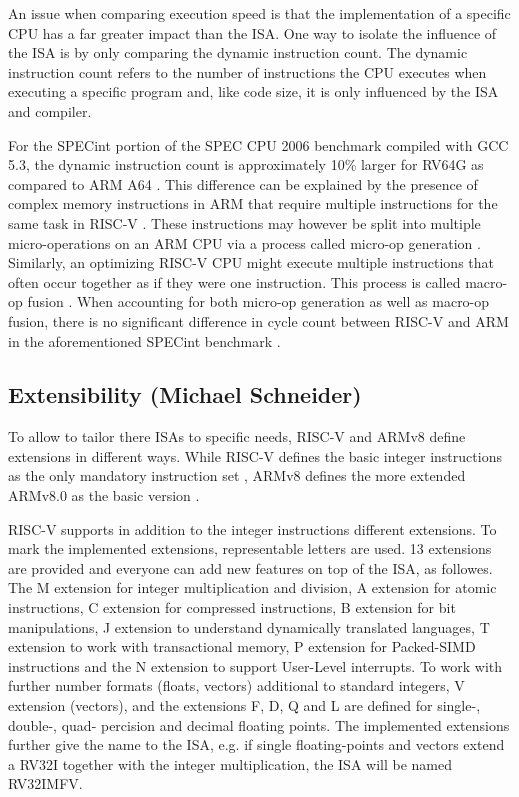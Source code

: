 \documentclass[conference]{IEEEtran}
\begin{document}
	An issue when comparing execution speed is that the implementation of a specific \gls{CPU} has a far greater impact than the \gls{ISA}.
	One way to isolate the influence of the ISA is by only comparing the dynamic instruction count.
	The dynamic instruction count refers to the number of instructions the \gls{CPU} executes when executing a specific program
	and, like code size, it is only influenced by the \gls{ISA} and compiler.

	For the SPECint portion of the SPEC CPU 2006 benchmark compiled with GCC 5.3, the dynamic instruction count is approximately
	10\% larger for RV64G as compared to ARM A64 \cite[slide 38]{Celio2016}.
	This difference can be explained by the presence of complex memory instructions in ARM that require multiple instructions
	for the same task in RISC-V \cite[slide 40]{Celio2016}.
	These instructions may however be split into multiple micro-operations on an ARM \gls{CPU} via a process called micro-op generation \cite[slide 40]{Celio2016}.
	Similarly, an optimizing RISC-V CPU might execute multiple instructions that often occur together as if they were one instruction.
	This process is called macro-op fusion \cite[slide 16]{Celio2016}.
	When accounting for both micro-op generation as well as macro-op fusion, there is no significant difference in cycle count between RISC-V and ARM
	in the aforementioned SPECint benchmark \cite[slide 38]{Celio2016}.


	\subsection{Extensibility (Michael Schneider)}\label{sec:extensibility}
	To allow to tailor there \glspl{ISA} to specific needs,  RISC-V and ARMv8 define extensions in different ways. While RISC-V defines the basic integer instructions as the only mandatory instruction set \cite[page 3f]{Waterman2017}, ARMv8 defines the more extended ARMv8.0 as the basic version \cite[page 60]{Arm2020}.
	
	RISC-V supports in addition to the integer instructions different extensions. To mark the implemented extensions, representable letters are used. 13 extensions are provided and everyone can add new features on top of the \gls{ISA}, as followes. The M extension for integer multiplication and division, A extension for atomic instructions, C extension for compressed instructions, B extension for bit manipulations, J extension to understand dynamically translated languages, T extension to work with transactional memory, P extension for Packed-SIMD instructions and the N extension to support User-Level interrupts. To work with further number formats (floats, vectors) additional to standard integers, V extension (vectors), and the extensions F, D, Q and L are defined for single-, double-, quad- percision and decimal floating points. The implemented extensions further give the name to the \gls{ISA}, e.g. if single floating-points and vectors extend a RV32I together with the integer multiplication, the \gls{ISA} will be named RV32IMFV. \cite[page 31-52, 71-103]{Waterman2017}
	
\end{document}
